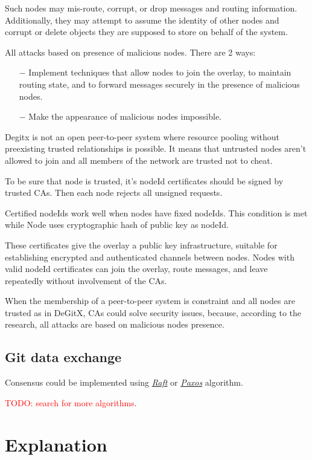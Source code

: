 \documentclass[nonacm=true]{acmart}
\newcommand{\todo}[1]{\textcolor{red}{TODO: #1}}
\begin{document}
Such nodes may mis-route, corrupt, or drop messages and routing information.
Additionally, they may attempt to assume the identity of other nodes and corrupt or delete objects
they are supposed to store on behalf of the system.

All attacks based on presence of malicious nodes.
There are 2 ways:
\begin{itemize}
  \item[$-$] Implement techniques that allow nodes to join the overlay, to maintain routing state, and to forward messages securely in the presence of malicious nodes.
  \item[$-$] Make the appearance of malicious nodes impossible.
\end{itemize}

Degitx is not an open peer-to-peer system
where resource pooling without preexisting trusted relationships is possible.
It means that untrusted nodes aren't allowed to join
and all members of the network are trusted not to cheat.

To be sure that node is trusted, it's nodeId certificates should be signed by trusted CAs.
Then each node rejects all unsigned requests.

Certified nodeIds work well when nodes have fixed nodeIds.
This condition is met while Node uses cryptographic hash of public key as nodeId.

These certificates give the overlay a public key infrastructure,
suitable for establishing encrypted and authenticated channels between nodes.
Nodes with valid nodeId certificates can join the overlay, route messages,
and leave repeatedly without involvement of the CAs.

When the membership of a peer-to-peer system is constraint and all nodes are trusted as in DeGitX,
CAs could solve security issues, because, according to the ~\cite{securerouting} research, all attacks are based on malicious nodes presence.

\subsection{Git data exchange}
\label{sec:data}
Consensus could be implemented using \emph{\href{https://raft.github.io/raft.pdf}{Raft}} or
\emph{\href{http://www.cs.yale.edu/homes/aspnes/pinewiki/Paxos.html}{Paxos}} algorithm.

\todo{search for more algorithms}.

\section{Explanation}
\end{document}
